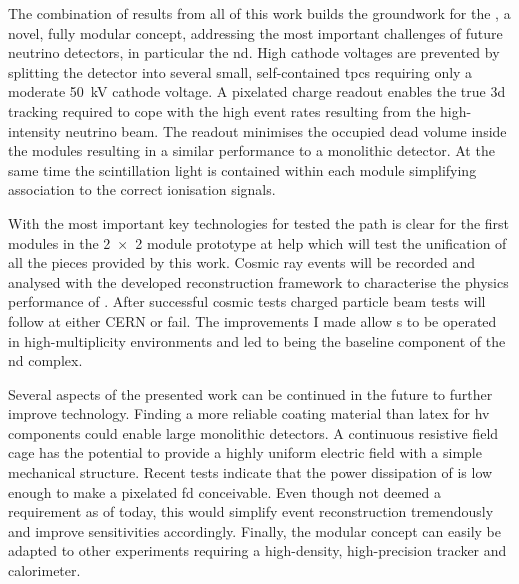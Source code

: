 The combination of results from all of this work builds the groundwork for the \AC{}, a novel, fully modular \lartpc{} concept, addressing the most important challenges of future neutrino detectors, in particular the \dune{} \gls{nd}.
High cathode voltages are prevented by splitting the detector into several small, self-contained \glspl{tpc} requiring only a moderate \SI{50}{\kilo\volt} cathode voltage.
A pixelated charge readout enables the true \gls{3d} tracking required to cope with the high event rates resulting from the high-intensity neutrino beam.
The \AL{} readout minimises the occupied dead volume inside the modules resulting in a similar performance to a monolithic detector.
At the same time the scintillation light is contained within each module simplifying association to the correct ionisation signals.

With the most important key technologies for \AC{} tested the path is clear for the first modules in the \num{2 x 2} module prototype at \gls{help} which will test the unification of all the pieces provided by this work.
Cosmic ray events will be recorded and analysed with the developed reconstruction framework to characterise the physics performance of \AC{}.
After successful cosmic tests charged particle beam tests will follow at either CERN or \gls{fail}.
The improvements I made allow \lartpc{}s to be operated in high-multiplicity environments and led to \AC{} being the baseline \lar{} component of the \dune{} \gls{nd} complex.

Several aspects of the presented work can be continued in the future to further improve \lartpc{} technology.
Finding a more reliable coating material than latex for \gls{hv} components could enable large monolithic detectors.
A continuous resistive field cage has the potential to provide a highly uniform electric field with a simple mechanical structure.
Recent tests indicate that the power dissipation of \larpix{} is low enough to make a pixelated \dune{} \gls{fd} conceivable.
Even though not deemed a requirement as of today, this would simplify event reconstruction tremendously and improve sensitivities accordingly.
Finally, the modular \AC{} concept can easily be adapted to other experiments requiring a high-density, high-precision tracker and calorimeter.